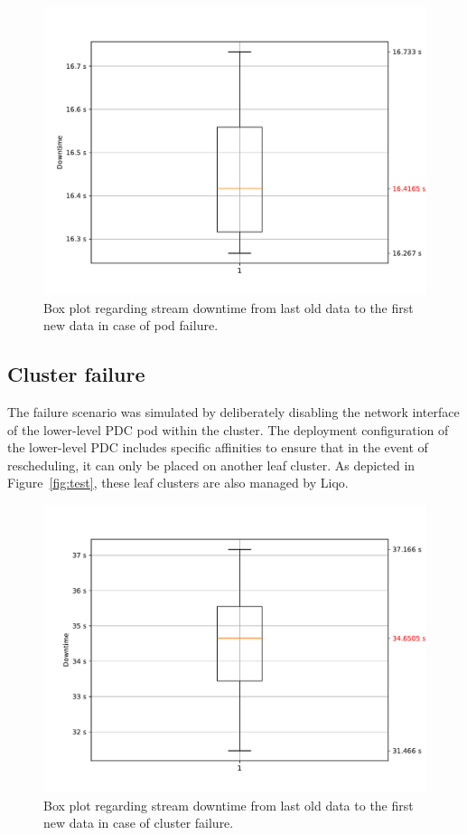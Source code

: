 \begin{figure}[ht]\centering
\includegraphics[scale=0.5]{Pictures/pdc-pod-down}
\caption{Box plot regarding stream downtime from last old data to the first new data in case of pod failure.}\label{graph:pod-down}
\end{figure}

\subsection{Cluster failure}
The failure scenario was simulated by deliberately disabling the network interface of the lower-level PDC pod within the cluster. The deployment configuration of the lower-level PDC includes specific affinities to ensure that in the event of rescheduling, it can only be placed on another leaf cluster. As depicted in Figure~\ref{fig:test}, these leaf clusters are also managed by Liqo.

\begin{figure}[ht]\centering
\includegraphics[scale=0.5]{Pictures/pdc-cluster-down}
\caption{Box plot regarding stream downtime from last old data to the first new data in case of cluster failure.}\label{graph:cluster-down}
\end{figure}

